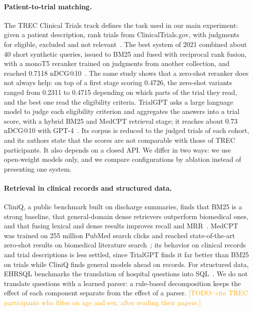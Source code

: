 \documentclass{article}
\newcommand{\todo}[1]{\textcolor{orange}{[TODO: #1]}}
\begin{document}
\paragraph{Patient-to-trial matching.} The TREC Clinical Trials track defines the task used in our main experiment: given a patient description, rank trials from ClinicalTrials.gov, with judgments for eligible, excluded and not relevant~\citep{roberts2022trecct}. The best system of 2021 combined about 40 short synthetic queries, issued to BM25 and fused with reciprocal rank fusion, with a monoT5 reranker trained on judgments from another collection, and reached 0.7118 nDCG@10~\citep{pradeep2022nqs}. The same study shows that a zero-shot reranker does not always help: on top of a first stage scoring 0.4726, the zero-shot variants ranged from 0.2311 to 0.4715 depending on which parts of the trial they read, and the best one read the eligibility criteria. TrialGPT asks a large language model to judge each eligibility criterion and aggregates the answers into a trial score, with a hybrid BM25 and MedCPT retrieval stage; it reaches about 0.73 nDCG@10 with GPT-4~\citep{jin2024trialgpt}. Its corpus is reduced to the judged trials of each cohort, and its authors state that the scores are not comparable with those of TREC participants. It also depends on a closed API. We differ in two ways: we use open-weight models only, and we compare configurations by ablation instead of presenting one system.

\paragraph{Retrieval in clinical records and structured data.} CliniQ, a public benchmark built on discharge summaries, finds that BM25 is a strong baseline, that general-domain dense retrievers outperform biomedical ones, and that fusing lexical and dense results improves recall and MRR~\citep{zhao2025cliniq}. MedCPT was trained on 255 million PubMed search clicks and reached state-of-the-art zero-shot results on biomedical literature search~\citep{jin2023medcpt}; its behavior on clinical records and trial descriptions is less settled, since TrialGPT finds it far better than BM25 on trials while CliniQ finds general models ahead on records. For structured data, EHRSQL benchmarks the translation of hospital questions into SQL~\citep{lee2022ehrsql}. We do not translate questions with a learned parser: a rule-based decomposition keeps the effect of each component separate from the effect of a parser. \todo{cite TREC participants who filter on age and sex, after reading their papers.}
\end{document}

